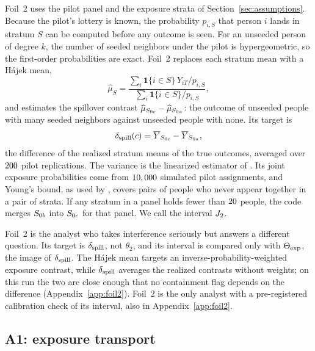 Foil~2 uses the pilot panel and the exposure strata of
Section~\ref{sec:assumptions}. Because the pilot's lottery is known, the
probability $p_{i,S}$ that person $i$ lands in stratum $S$ can be computed before
any outcome is seen. For an unseeded person of degree $k$, the number of seeded
neighbors under the pilot is hypergeometric, so the first-order probabilities are
exact. Foil~2 replaces each stratum mean with a H\'ajek mean,
\begin{equation}\label{eq:hajek}
  \widehat\mu_S
  =\frac{\sum_i \mathbf{1}\{i\in S\}\,Y_{iT}/p_{i,S}}{\sum_i \mathbf{1}\{i\in S\}/p_{i,S}},
\end{equation}
and estimates the spillover contrast
$\widehat\mu_{S_{0c}}-\widehat\mu_{S_{0a}}$: the outcome of unseeded people with many
seeded neighbors against unseeded people with none. Its target is
\begin{equation}\label{eq:spill}
  \delta_{\mathrm{spill}}(c)=\overline Y_{S_{0c}}-\overline Y_{S_{0a}},
\end{equation}
the difference of the realized stratum means of the true outcomes, averaged over
$200$ pilot replications. The variance is the linearized estimator of
\citet{aronow2017}. Its joint exposure probabilities come from $10,000$
simulated pilot assignments, and Young's bound, as used by \citet{aronow2017},
covers pairs of people who never appear together in a pair of strata. If any
stratum in a panel holds fewer than $20$ people, the code merges $S_{0b}$
into $S_{0c}$ for that panel. We call the interval $J_2$.

Foil~2 is the analyst who takes interference seriously but answers a different
question. Its target is $\delta_{\mathrm{spill}}$, not $\theta_2$, and its interval is compared
only with $\Theta_{\mathrm{exp}}$, the image of $\delta_{\mathrm{spill}}$. The H\'ajek mean targets an
inverse-probability-weighted exposure contrast, while $\delta_{\mathrm{spill}}$ averages the
realized contrasts without weights; on this run the two are close enough that no
containment flag depends on the difference (Appendix~\ref{app:foil2}). Foil~2 is
the only analyst with a pre-registered calibration check of its interval, also in
Appendix~\ref{app:foil2}.

\subsection{A1: exposure transport}\label{sec:a1}


